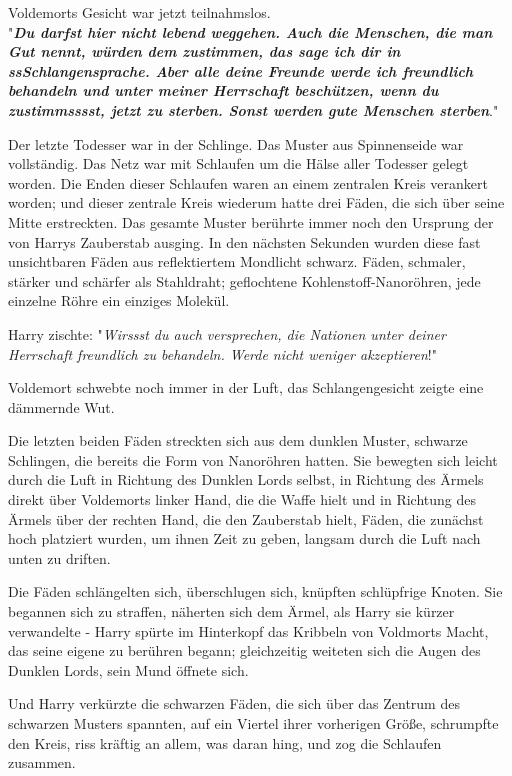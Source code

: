 {Voldemorts Gesicht war jetzt teilnahmslos.\\ "\textbf{\emph{Du darfst hier nicht lebend weggehen. Auch die Menschen, die man Gut nennt, würden dem zustimmen, das sage ich dir in ssSchlangensprache. Aber alle deine Freunde werde ich freundlich behandeln und unter meiner Herrschaft beschützen, wenn du zustimmsssst, jetzt zu sterben. Sonst werden gute Menschen sterben}}."

Der letzte Todesser war in der Schlinge. Das Muster aus Spinnenseide war vollständig. Das Netz war mit Schlaufen um die Hälse aller Todesser gelegt worden. Die Enden dieser Schlaufen waren an einem zentralen Kreis verankert worden; und dieser zentrale Kreis wiederum hatte drei Fäden, die sich über seine Mitte erstreckten. Das gesamte Muster berührte immer noch den Ursprung der von Harrys Zauberstab ausging. In den nächsten Sekunden wurden diese fast unsichtbaren Fäden aus reflektiertem Mondlicht schwarz. Fäden, schmaler, stärker und schärfer als Stahldraht; geflochtene Kohlenstoff-Nanoröhren, jede einzelne Röhre ein einziges Molekül.

Harry zischte: "\emph{Wirssst du auch versprechen, die Nationen unter deiner Herrschaft freundlich zu behandeln. Werde nicht weniger akzeptieren}!"

Voldemort schwebte noch immer in der Luft, das Schlangengesicht zeigte eine dämmernde Wut.

Die letzten beiden Fäden streckten sich aus dem dunklen Muster, schwarze Schlingen, die bereits die Form von Nanoröhren hatten. Sie bewegten sich leicht durch die Luft in Richtung des Dunklen Lords selbst, in Richtung des Ärmels direkt über Voldemorts linker Hand, die die Waffe hielt und in Richtung des Ärmels über der rechten Hand, die den Zauberstab hielt, Fäden, die zunächst hoch platziert wurden, um ihnen Zeit zu geben, langsam durch die Luft nach unten zu driften.

Die Fäden schlängelten sich, überschlugen sich, knüpften schlüpfrige Knoten. Sie begannen sich zu straffen, näherten sich dem Ärmel, als Harry sie kürzer verwandelte - Harry spürte im Hinterkopf das Kribbeln von Voldmorts Macht, das seine eigene zu berühren begann; gleichzeitig weiteten sich die Augen des Dunklen Lords, sein Mund öffnete sich.

Und Harry verkürzte die schwarzen Fäden, die sich über das Zentrum des schwarzen Musters spannten, auf ein Viertel ihrer vorherigen Größe, schrumpfte den Kreis, riss kräftig an allem, was daran hing, und zog die Schlaufen zusammen.

}
